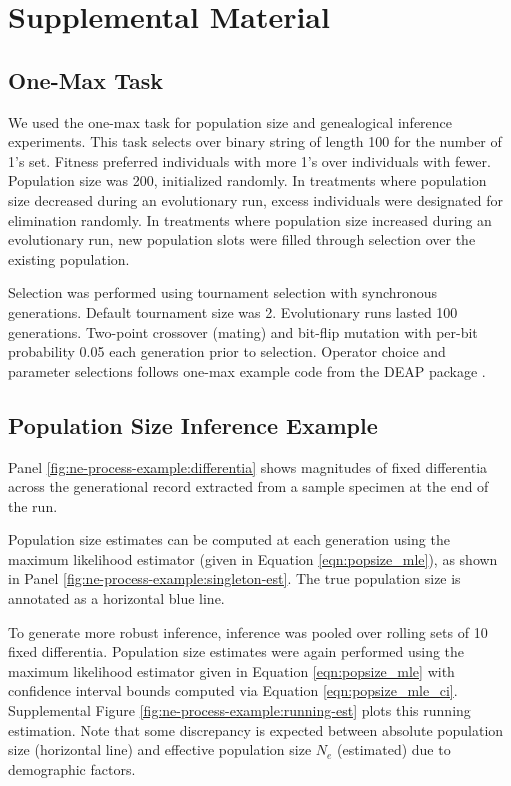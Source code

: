 \section{Supplemental Material}

\subsection{One-Max Task}
\label{sec:one-max}

We used the one-max task for population size and genealogical inference experiments.
This task selects over binary string of length 100 for the number of 1's set.
Fitness preferred individuals with more 1's over individuals with fewer.
Population size was 200, initialized randomly.
In treatments where population size decreased during an evolutionary run, excess individuals were designated for elimination randomly.
In treatments where population size increased during an evolutionary run,
new population slots were filled through selection over the existing population.

Selection was performed using tournament selection with synchronous generations.
Default tournament size was 2.
Evolutionary runs lasted 100 generations.
Two-point crossover (mating) and bit-flip mutation with per-bit probability 0.05 each generation prior to selection.
Operator choice and parameter selections follows one-max example code from the DEAP package \citep{fortin2012deap}.

\subsection{Population Size Inference Example}
\label{sec:population-size-inference-example}



Panel \ref{fig:ne-process-example:differentia} shows magnitudes of fixed differentia across the generational record extracted from a sample specimen at the end of the run.

Population size estimates can be computed at each generation using the maximum likelihood estimator (given in Equation \ref{eqn:popsize_mle}), as shown in Panel \ref{fig:ne-process-example:singleton-est}.
The true population size is annotated as a horizontal blue line.

To generate more robust inference, inference was pooled over rolling sets of 10 fixed differentia.
Population size estimates were again performed using the maximum likelihood estimator given in Equation \ref{eqn:popsize_mle} with confidence interval bounds computed via Equation \ref{eqn:popsize_mle_ci}.
Supplemental Figure \ref{fig:ne-process-example:running-est} plots this running estimation.
Note that some discrepancy is expected between absolute population size (horizontal line) and effective population size $N_e$ (estimated) due to demographic factors.



